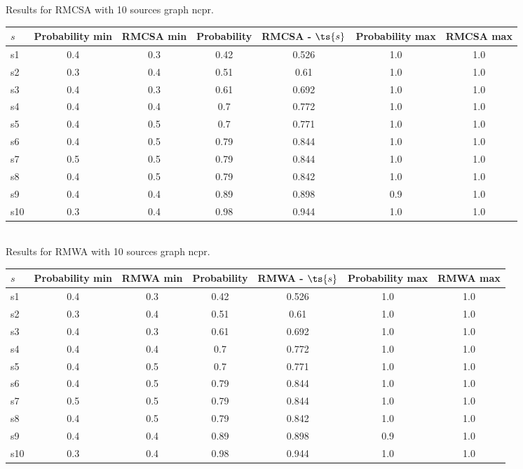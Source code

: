 \documentclass{article}
\begin{document}
\noindent Results for RMCSA with 10 sources graph ncpr.

\noindent\begin{tabular}{|l|c|c|c|c|c|c|}
\hline
$s$& Probability min & RMCSA min & Probability & RMCSA - $\ts{s}$ & Probability max & RMCSA max\\
\hline
s1 &0.4 & 0.3 & 0.42 & 0.526 & 1.0 & 1.0\\
\hline
s2 &0.3 & 0.4 & 0.51 & 0.61 & 1.0 & 1.0\\
\hline
s3 &0.4 & 0.3 & 0.61 & 0.692 & 1.0 & 1.0\\
\hline
s4 &0.4 & 0.4 & 0.7 & 0.772 & 1.0 & 1.0\\
\hline
s5 &0.4 & 0.5 & 0.7 & 0.771 & 1.0 & 1.0\\
\hline
s6 &0.4 & 0.5 & 0.79 & 0.844 & 1.0 & 1.0\\
\hline
s7 &0.5 & 0.5 & 0.79 & 0.844 & 1.0 & 1.0\\
\hline
s8 &0.4 & 0.5 & 0.79 & 0.842 & 1.0 & 1.0\\
\hline
s9 &0.4 & 0.4 & 0.89 & 0.898 & 0.9 & 1.0\\
\hline
s10 &0.3 & 0.4 & 0.98 & 0.944 & 1.0 & 1.0\\
\hline
\end{tabular}\\

\noindent Results for RMWA with 10 sources graph ncpr.

\noindent\begin{tabular}{|l|c|c|c|c|c|c|}
\hline
$s$& Probability min & RMWA min & Probability & RMWA - $\ts{s}$ & Probability max & RMWA max\\
\hline
s1 &0.4 & 0.3 & 0.42 & 0.526 & 1.0 & 1.0\\
\hline
s2 &0.3 & 0.4 & 0.51 & 0.61 & 1.0 & 1.0\\
\hline
s3 &0.4 & 0.3 & 0.61 & 0.692 & 1.0 & 1.0\\
\hline
s4 &0.4 & 0.4 & 0.7 & 0.772 & 1.0 & 1.0\\
\hline
s5 &0.4 & 0.5 & 0.7 & 0.771 & 1.0 & 1.0\\
\hline
s6 &0.4 & 0.5 & 0.79 & 0.844 & 1.0 & 1.0\\
\hline
s7 &0.5 & 0.5 & 0.79 & 0.844 & 1.0 & 1.0\\
\hline
s8 &0.4 & 0.5 & 0.79 & 0.842 & 1.0 & 1.0\\
\hline
s9 &0.4 & 0.4 & 0.89 & 0.898 & 0.9 & 1.0\\
\hline
s10 &0.3 & 0.4 & 0.98 & 0.944 & 1.0 & 1.0\\
\hline
\end{tabular}\\
\end{document}
